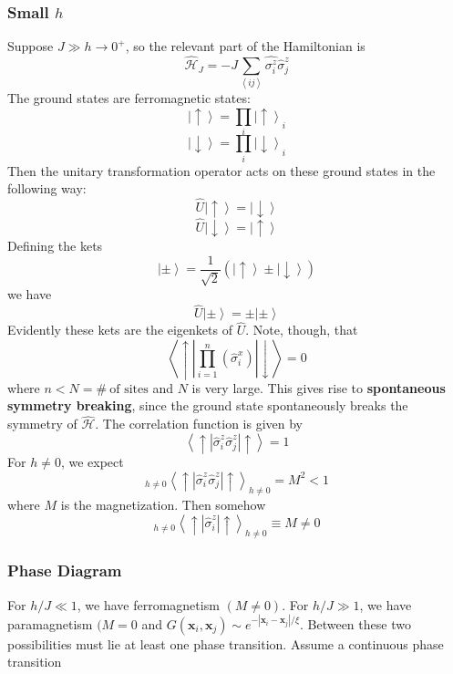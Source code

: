 \documentclass{article}
\begin{document}
	\subsubsection{Small $h$}
	Suppose $J\gg h\to0^+$, so the relevant part of the Hamiltonian is
	$$\hat{\mathcal{H}}_J=-J\sum_{\left<ij\right>}\hat{\sigma_i^z}\hat{\sigma}_j^z$$
	The ground states are ferromagnetic states:
	$$\left|\uparrow\right>=\prod_i\left|\uparrow\right>_i$$
	$$\left|\downarrow\right>=\prod_i\left|\downarrow\right>_i$$
	Then the unitary transformation operator acts on these ground states in the following way:
	$$\hat{U}\left|\uparrow\right>=\left|\downarrow\right>$$
	$$\hat{U}\left|\downarrow\right>=\left|\uparrow\right>$$
	Defining the kets
	$$\left|\pm\right>=\frac{1}{\sqrt{2}}\left(\left|\uparrow\right>\pm\left|\downarrow\right>\right)$$
	we have
	$$\hat{U}\left|\pm\right>=\pm\left|\pm\right>$$
	Evidently these kets are the eigenkets of $\hat{U}$. Note, though, that
	$$\left<\uparrow\left|\prod_{i=1}^n\left(\hat{\sigma}_i^x\right)\right|\downarrow\right>=0$$
	where $n<N=\#\ \textrm{of sites}$ and $N$ is very large. This gives rise to \textbf{spontaneous symmetry breaking}, since the ground state spontaneously breaks the symmetry of $\hat{\mathcal{H}}$. The correlation function is given by
	$$\left<\uparrow\left|\hat{\sigma}_i^z\hat{\sigma}_j^z\right|\uparrow\right>=1$$
	For $h\neq 0$, we expect
	$$_{h\neq 0}\left<\uparrow\left|\hat{\sigma}_i^z\hat{\sigma}_j^z\right|\uparrow\right>_{h\neq 0}=M^2<1$$
	where $M$ is the magnetization. Then somehow
	$$_{h\neq 0}\left<\uparrow\left|\hat{\sigma}_i^z\right|\uparrow\right>_{h\neq 0}\equiv M\neq 0$$
	\subsubsection{Phase Diagram}
	For $h/J\ll 1$, we have ferromagnetism $(M\neq 0)$. For $h/J\gg 1$, we have paramagnetism $(M=0$ and $G(\mathbf{x}_i,\mathbf{x}_j)\sim e^{-\left|\mathbf{x}_i-\mathbf{x}_j\right|/\xi}$. Between these two possibilities must lie at least one phase transition. Assume a continuous phase transition
	
	
	
	
	
\end{document}

